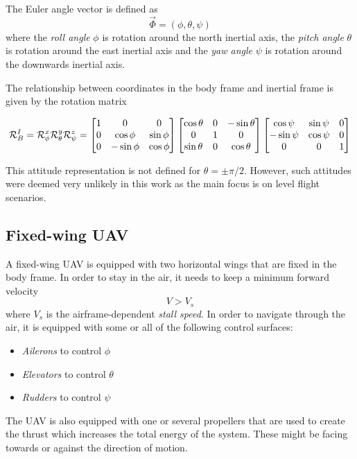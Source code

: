 \begin{definition}
The Euler angle vector is defined as
\begin{equation}
    \vec{\Phi}=(\phi, \theta, \psi)
\end{equation}
where the \textit{roll angle} $\phi$ is rotation around the north inertial axis, 
the \textit{pitch angle} $\theta$ is rotation around the east inertial axis and
the \textit{yaw angle} $\psi$ is rotation around the downwards inertial axis.

The relationship between coordinates in the body frame and inertial frame is given
 by the rotation matrix

\begin{equation}\label{eq:r_i_b}
\mathcal{R}^I_B = \mathcal{R}^x_\phi\mathcal{R}^y_\theta\mathcal{R}^z_\psi\\
=
\begin{bmatrix}
    1 & 0 & 0 \\
    0 & \cos\phi & \sin\phi \\
    0 & -\sin\phi & \cos\phi
\end{bmatrix}
\begin{bmatrix}
    \cos\theta & 0 & -\sin\theta \\
    0 & 1 & 0 \\
    \sin\theta & 0 & \cos\theta
\end{bmatrix}      
\begin{bmatrix}
    \cos\psi & \sin\psi & 0 \\
    -\sin\psi & \cos\psi & 0 \\
    0 & 0 & 1
\end{bmatrix}
\end{equation}  
\end{definition}

This attitude representation is not defined for $\theta=\pm\pi/2$. However, such attitudes
 were deemed very unlikely in this work as the main focus is on level flight scenarios.

\subsection{Fixed-wing UAV}
A fixed-wing UAV is equipped with two horizontal wings that are fixed in the body frame.
In order to stay in the air, it needs to keep a minimum forward velocity
\begin{equation}
    V > V_{s}
\end{equation}
where $V_s$ is the airframe-dependent \textit{stall speed}. In order to navigate through the
air, it is equipped with some or all of the following control surfaces:
\begin{itemize}
    \item \textit{Ailerons} to control $\phi$
    \item \textit{Elevators} to control $\theta$
    \item \textit{Rudders} to control $\psi$
\end{itemize}
The UAV is also equipped with one or several propellers that are used to create the thrust which
increases the total energy of the system. These might be facing towards or against the direction of motion.


